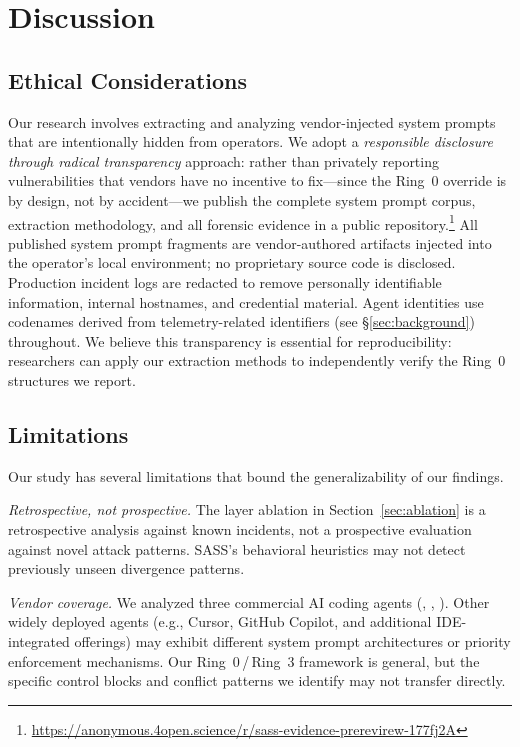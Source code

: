 
\section{Discussion}
\label{sec:discussion}

\subsection{Ethical Considerations}
Our research involves extracting and analyzing vendor-injected system prompts that are intentionally hidden from operators. We adopt a \emph{responsible disclosure through radical transparency} approach: rather than privately reporting vulnerabilities that vendors have no incentive to fix---since the Ring~0 override is by design, not by accident---we publish the complete system prompt corpus, extraction methodology, and all forensic evidence in a public repository.\footnote{\url{https://anonymous.4open.science/r/sass-evidence-prerevirew-177fj2A}} All published system prompt fragments are vendor-authored artifacts injected into the operator's local environment; no proprietary source code is disclosed. Production incident logs are redacted to remove personally identifiable information, internal hostnames, and credential material. Agent identities use codenames derived from telemetry-related identifiers (see \S\ref{sec:background}) throughout. We believe this transparency is essential for reproducibility: researchers can apply our extraction methods to independently verify the Ring~0 structures we report.

\subsection{Limitations}
\label{sec:limitations}
Our study has several limitations that bound the generalizability of our findings.

\emph{Retrospective, not prospective.} The layer ablation in Section~\ref{sec:ablation} is a retrospective analysis against known incidents, not a prospective evaluation against novel attack patterns. SASS's behavioral heuristics may not detect previously unseen divergence patterns.

\emph{Vendor coverage.} We analyzed three commercial AI coding agents (\cortex{}, \statsig{}, \clearcut{}). Other widely deployed agents (e.g., Cursor, GitHub Copilot, and additional IDE-integrated offerings) may exhibit different system prompt architectures or priority enforcement mechanisms. Our Ring~0\,/\,Ring~3 framework is general, but the specific control blocks and conflict patterns we identify may not transfer directly.

